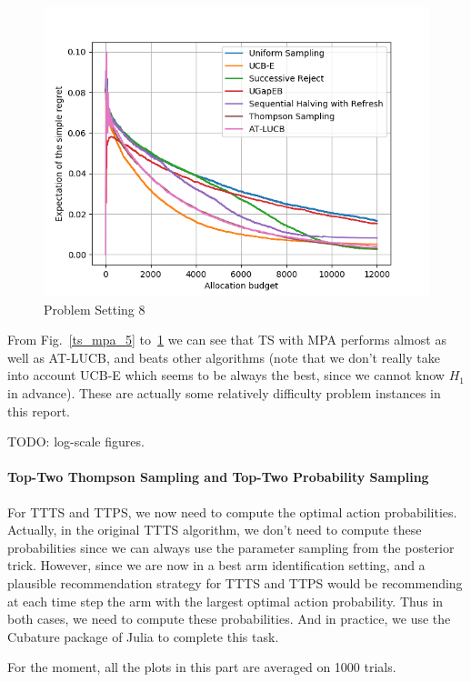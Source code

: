 \documentclass[runningheads,a4paper]{llncs}
\begin{document}
\begin{figure}[ht]
    	\centering\includegraphics[width=\textwidth]{../results/ts_mpa/setting8.png}
    	\caption{Problem Setting 8}
	\label{ts_mpa_8}
\end{figure}

From Fig.~\ref{ts_mpa_5} to~\ref{ts_mpa_8} we can see that TS with MPA performs almost as well as AT-LUCB, and beats other algorithms (note that we don't really take into account UCB-E which seems to be always the best, since we cannot know $H_1$ in advance). These are actually some relatively difficulty problem instances in this report.

TODO: log-scale figures.

\paragraph{\bfseries{Top-Two Thompson Sampling and Top-Two Probability Sampling}}
For TTTS and TTPS, we now need to compute the optimal action probabilities. Actually, in the original TTTS algorithm, we don't need to compute these probabilities since we can always use the parameter sampling from the posterior trick. However, since we are now in a best arm identification setting, and a plausible recommendation strategy for TTTS and TTPS would be recommending at each time step the arm with the largest optimal action probability. Thus in both cases, we need to compute these probabilities. And in practice, we use the Cubature package of Julia to complete this task.

For the moment, all the plots in this part are averaged on 1000 trials.
\end{document}

